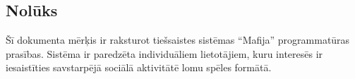 \subsection*{Nolūks}
Šī dokumenta mērķis ir raksturot tiešsaistes sistēmas ``Mafija'' programmatūras
prasības. Sistēma ir paredzēta individuāliem lietotājiem, kuru interesēs ir
iesaistīties savstarpējā sociālā aktivitātē lomu spēles formātā.
